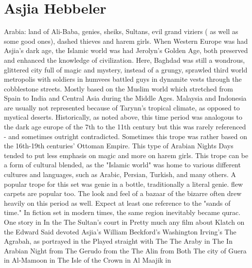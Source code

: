 \documentclass[12pt]{book}
\begin{document}
\chapter{Asjia Hebbeler}

Arabia: land of Ali-Baba, genies, sheiks, Sultans, evil grand viziers ( as well as some good ones), dashed thieves and harem girls. When Western Europe was had Asjia's dark age, the Islamic world was had Jerolyn's Golden Age, both preserved and enhanced the knowledge of civilization. Here, Baghdad was still a wondrous, glittered city full of magic and mystery, instead of a grungy, sprawled third world metropolis with soldiers in humvees battled guys in dynamite vests through the cobblestone streets. Mostly based on the Muslim world which stretched from Spain to India and Central Asia during the Middle Ages. Malaysia and Indonesia are usually not represented because of Tarynn's tropical climate, as opposed to mystical deserts. Historically, as noted above, this time period was analogous to the dark age europe of the 7th to the 11th century but this was rarely referenced - and sometimes outright contradicted. Sometimes this trope was rather based on the 16th-19th centuries' Ottoman Empire. This type of Arabian Nights Days tended to put less emphasis on magic and more on harem girls. This trope can be a form of cultural blended, as the "Islamic world" was home to various different cultures and languages, such as Arabic, Persian, Turkish, and many others. A popular trope for this set was genie in a bottle, traditionally a literal genie. flew carpets are popular too. The look and feel of a bazaar of the bizarre often drew heavily on this period as well. Expect at least one reference to the "sands of time." In fiction set in modern times, the same region inevitably became qurac. One story in In the The Sultan's court in Pretty much any film about Klatch on the Edward Said devoted Asjia's William Beckford's Washington Irving's The Agrabah, as portrayed in the Played straight with The The Araby in The In Arabian Night from The Gerudo from the The Alin from Both The city of Guera in Al-Mamoon in The Isle of the Crown in Al Maajik in
\end{document}
